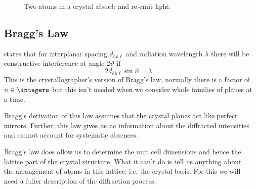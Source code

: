 \documentclass[fleqn]{NotesClass}
\begin{document}
\begin{figure}
        \caption{Two atoms in a crystal absorb and re-emit light.}
    \end{figure}

    \subsection{Bragg's Law}
     states that for interplanar spacing \(d_{hk\ell}\) and radiation wavelength \(\lambda\) there will be constructive interference at angle \(2\vartheta\) if
    \begin{equation}
        2d_{hk\ell} \sin\vartheta = \lambda
    \end{equation}
    This is the crystallographer's version of Bragg's law, normally there is a factor of \(n \in \integers\) but this isn't needed when we consider whole families of planes at a time.
    
    Bragg's derivation of this law assumes that the crystal planes act like perfect mirrors.
    Further, this law gives us no information about the diffracted intensities and cannot account for systematic absences.
    
    Bragg's law does allow us to determine the unit cell dimensions and hence the lattice part of the crystal structure.
    What it can't do is tell us anything about the arrangement of atoms in this lattice, i.e. the crystal basis.
    For this we will need a fuller description of the diffraction process.
    
\end{document}
